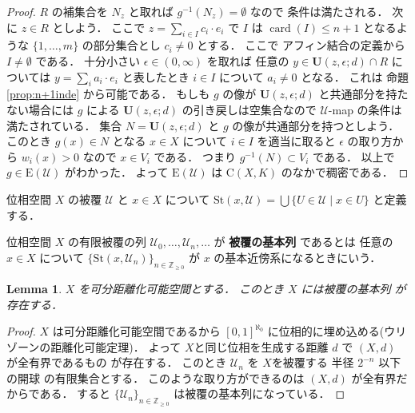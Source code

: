 \documentclass[leqno, a4paper, 12pt]{jsarticle}
\theoremstyle{plain}
\newtheorem{lem}[thm]{Lemma}
\theoremstyle{definition}
\theoremstyle{remark}
\newcommand{\zz}{\mathbb{Z}}
\DeclareMathOperator{\card}{\mathrm{card}}
\newcommand{\yoemph}[1]{\textbf{#1}}
\newcommand{\yocovf}[1]{\mathscr{#1}}
\newcommand{\yostset}[1]{\mathrm{St}(#1)}
\newcommand{\yofuncsp}[2]{\mathrm{C}(#1, #2)}
\newcommand{\yofsusm}[1]{\mathrm{E}(#1)}
\newcommand{\yoballfont}{\mathbf}
\newcommand{\yometoball}[3]{\yoballfont{U}(#1, #2; #3)}
\numberwithin{equation}{section}
\begin{document}
\begin{proof}
$R$
の補集合を
$N_{z}$
と取れば
$g^{-1}(N_{z})=\emptyset$
なので
条件は満たされる．
次に
$z\in R$
としよう．
ここで
$z=\sum_{i\in I}c_{i}\cdot e_{i}$
で
$I$
は
$\card(I)\le n+1$
となるような
$\{1, \dots, m\}$
の部分集合とし
$c_{i}\neq 0$
とする．
ここで
アフィン結合の定義から
$I\neq \emptyset$
である．
十分小さい
$\epsilon\in (0, \infty)$
を取れば
任意の
$y\in \yometoball{z}{\epsilon}{d}\cap R$
については
$y=\sum_{i}a_{i}\cdot e_{i}$
と表したとき
$i\in I$
について
$a_{i}\neq 0$
となる．
これは
命題
\ref{prop:n+1inde}
から可能である．
もしも
$g$
の像が
$\yometoball{z}{\epsilon}{d}$
と共通部分を持たない場合には
$g$
による
$\yometoball{z}{\epsilon}{d}$
の引き戻しは空集合なので
$\yocovf{U}$-map
の条件は満たされている．
集合
$N=\yometoball{z}{\epsilon}{d}$
と
$g$
の像が共通部分を持つとしよう．
このとき
$g(x)\in N$
となる
$x\in X$
について
$i\in I$
を適当に取ると
$\epsilon$
の取り方から
$w_{i}(x)>0$
なので
$x\in V_{i}$
である．
つまり
$g^{-1}(N)\subset V_{i}$
である．
以上で
$g\in \yofsusm{\yocovf{U}}$
がわかった．
よって
$\yofsusm{\yocovf{U}}$
は
$\yofuncsp{X}{K}$
のなかで稠密である．
\end{proof}


位相空間
$X$
の被覆
$\yocovf{U}$
と
$x\in X$
について
$\yostset{x, \yocovf{U}}=\bigcup\{U\in \yocovf{U}\mid x\in U\}$
と定義する．

位相空間
$X$
の有限被覆の列
$\yocovf{U}_{0}, \dots, \yocovf{U}_{n}, \dots$
が
\yoemph{被覆の基本列}
であるとは
任意の$x\in X$
について
$\{\yostset{x, \yocovf{U}_{n}}\}_{n\in \zz_{\ge 0}}$
が
$x$
の基本近傍系になるときにいう．

\begin{lem}\label{lem:kihonretu}
$X$
を可分距離化可能空間とする．
このとき
$X$
には被覆の基本列
が存在する．
\end{lem}
\begin{proof}
$X$
は可分距離化可能空間であるから
$[0, 1]^{\aleph_{0}}$
に位相的に埋め込める(ウリゾーンの距離化可能定理)．
よって
$X$と同じ位相を生成する距離
$d$
で
$(X, d)$
が全有界であるもの
が存在する．
このとき
$\yocovf{U}_{n}$
を
$X$を被覆する
半径
$2^{-n}$
以下の開球
の有限集合とする．
このような取り方ができるのは
$(X, d)$
が全有界だからである．
すると
$\{\yocovf{U}_{n}\}_{n\in \zz_{\ge0}}$
は被覆の基本列になっている．
\end{proof}
\end{document}
